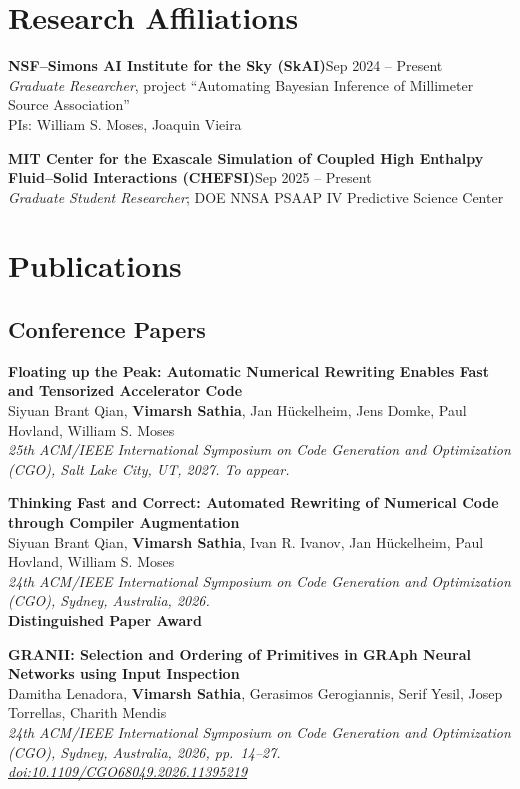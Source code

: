\documentclass[11pt,letterpaper]{article}
\newcommand{\me}{\textbf{Vimarsh Sathia}}
\newcommand{\entry}[2]{\needspace{2.5\baselineskip}\textbf{#1}\hfill #2\\}
\newenvironment{tagged}[1]{%
  \begin{description}[leftmargin=#1, labelwidth=\dimexpr#1-0.8em\relax,
    labelsep=0.8em, align=right, font=\normalfont, itemsep=1pt, topsep=1pt]}
  {\end{description}}
\newcommand{\pub}[4]{\begin{minipage}[t]{\linewidth}\raggedright\textbf{#1}\\ #2\\ \textit{#3}#4\end{minipage}}
\newcommand{\award}[1]{\\ \textcolor{red!60!black}{\textbf{#1}}}
\begin{document}
\section{Research Affiliations}
\entry{NSF--Simons AI Institute for the Sky (SkAI)}{Sep 2024 -- Present}
\textit{Graduate Researcher}, project ``Automating Bayesian Inference of Millimeter Source Association''\\
PIs: William S. Moses, Joaquin Vieira

\vspace{4pt}
\entry{MIT Center for the Exascale Simulation of Coupled High Enthalpy Fluid--Solid Interactions (CHEFSI)}{Sep 2025 -- Present}
\textit{Graduate Student Researcher}; DOE NNSA PSAAP IV Predictive Science Center

\section{Publications}
\subsection*{Conference Papers}
\begin{tagged}{7.6em}
  \item[{[CGO'27]}] \pub{Floating up the Peak: Automatic Numerical Rewriting Enables Fast and Tensorized Accelerator Code}
    {Siyuan Brant Qian, \me, Jan H\"uckelheim, Jens Domke, Paul Hovland, William S. Moses}
    {25th ACM/IEEE International Symposium on Code Generation and Optimization (CGO), Salt Lake City, UT, 2027. To appear.}{}

  \item[{[CGO'26a]}] \pub{Thinking Fast and Correct: Automated Rewriting of Numerical Code through Compiler Augmentation}
    {Siyuan Brant Qian, \me, Ivan R. Ivanov, Jan H\"uckelheim, Paul Hovland, William S. Moses}
    {24th ACM/IEEE International Symposium on Code Generation and Optimization (CGO), Sydney, Australia, 2026.}
    {\award{Distinguished Paper Award}}

  \item[{[CGO'26b]}] \pub{GRANII: Selection and Ordering of Primitives in GRAph Neural Networks using Input Inspection}
    {Damitha Lenadora, \me, Gerasimos Gerogiannis, Serif Yesil, Josep Torrellas, Charith Mendis}
    {24th ACM/IEEE International Symposium on Code Generation and Optimization (CGO), Sydney, Australia, 2026, pp.~14--27.
     \href{https://doi.org/10.1109/CGO68049.2026.11395219}{doi:10.1109/CGO68049.2026.11395219}}{}
\end{tagged}
\end{document}

